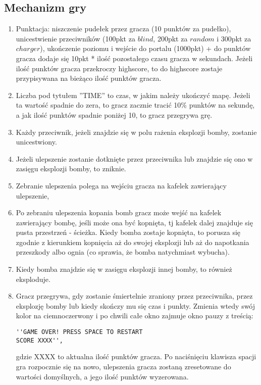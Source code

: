 \documentclass[12pt,a4paper]{article}
\begin{document}
\subsection{ Mechanizm gry}  
\begin{enumerate}
\item Punktacja: niszczenie pudełek przez gracza (10 punktów za pudełko), unicestwienie przeciwników (100pkt za $blind$, 200pkt za $random$ i 300pkt za $charger$), ukończenie poziomu i wejście do portalu (1000pkt) +  do punktów gracza dodaje się 10pkt * ilość pozostałego czasu gracza w sekundach. Jeżeli ilość punktów gracza przekroczy highscore, to do highscore zostaje przypisywana na bieżąco ilość punktów gracza.

\item Liczba pod tytułem ''TIME'' to czas, w jakim należy ukończyć mapę. Jeżeli ta wartość  spadnie do zera, to gracz zacznie tracić 10\% punktów na sekundę, a jak ilość punktów spadnie poniżej 10, to gracz przegrywa grę. 

\item Każdy przeciwnik, jeżeli znajdzie się w polu rażenia eksplozji bomby, zostanie unicestwiony.

\item Jeżeli ulepszenie zostanie dotknięte przez przeciwnika lub znajdzie się ono w zasięgu eksplozji bomby, to zniknie.

\item Zebranie ulepszenia polega na wejściu gracza na kafelek zawierający ulepszenie,

\item Po zebraniu ulepszenia kopania bomb gracz może wejść na kafelek zawierający bombę, jeśli może ona być kopnięta, tj kafelek dalej znajduje się pusta przestrzeń - ścieżka. Kiedy bomba zostaje kopnięta, to porusza się zgodnie z kierunkiem kopnięcia aż do swojej eksplozji lub aż do napotkania przeszkody albo ognia (co sprawia, że bomba natychmiast wybucha).
\item Kiedy bomba znajdzie się w zasięgu eksplozji innej bomby, to również eksploduje.

\item Gracz przegrywa, gdy zostanie śmiertelnie zraniony przez przeciwnika, przez eksplozję bomby lub kiedy skończy mu się czas i punkty. Zmienia wtedy swój kolor na ciemnoczerwony i po chwili całe okno zajmuje okno pauzy z treścią:
\begin{verbatim}
''GAME OVER! PRESS SPACE TO RESTART 
SCORE XXXX'',
\end{verbatim}
 gdzie XXXX to aktualna ilość punktów gracza. Po naciśnięciu klawisza spacji gra rozpocznie się na nowo, ulepszenia gracza zostaną zresetowane do wartości domyślnych, a jego ilość punktów wyzerowana.


\end{enumerate}
\end{document}
